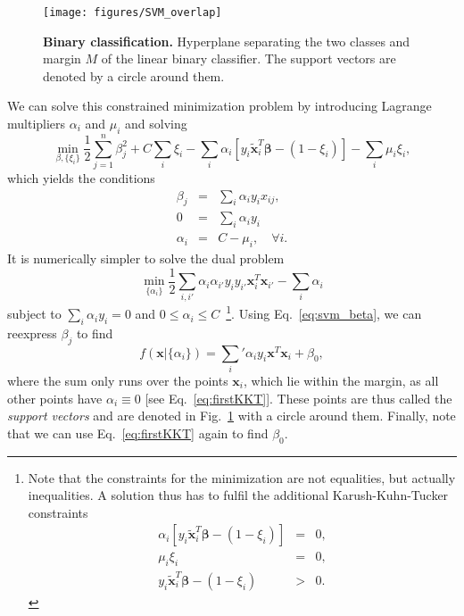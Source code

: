 \begin{figure}[bt]
  \centering
  \texttt{[image: figures/SVM\_overlap]}
  \caption{{\bf Binary classification.} Hyperplane separating the two classes and margin $M$ of the linear binary classifier. The support vectors are denoted by a circle around them.}
  \label{fig:svm}
\end{figure}
We can solve this constrained minimization problem by introducing Lagrange multipliers $\alpha_i$ and $\mu_i$ and solving 
\begin{equation}
  \min_{\beta, \{\xi_i\}} \frac12 \sum_{j=1}^{n} \beta_j^2 + C\sum_i \xi_i - \sum_i \alpha_i [y_i \tilde{\bm{x}}_i^T\bm{\beta} - (1-\xi_i)] - \sum_i\mu_i\xi_i,
  \label{eq:svm_lagrange}
\end{equation}
which yields the conditions
\begin{eqnarray}
  \beta_j &=& \sum_i \alpha_i y_i x_{ij},\label{eq:svm_beta}\\
  0 &=& \sum_i \alpha_i y_i\\
  \alpha_i &=& C-\mu_i, \quad \forall i.
\label{eq:svm_derivatives}
\end{eqnarray}
It is numerically simpler to solve the dual problem
\begin{equation}
  \min_{\{\alpha_i\}} \frac12 \sum_{i,i'} \alpha_i \alpha_{i'} y_i y_{i'} \bm{x}_i^T \bm{x}_{i'} - \sum_i \alpha_i
  \label{eq:svm_dual}
\end{equation}
subject to $\sum_i \alpha_i y_i =0$ and $0\leq \alpha_i \leq C$~\footnote{Note that the constraints for the minimization are not equalities, but actually inequalities. A solution thus has to fulfil the additional Karush-Kuhn-Tucker constraints
  \begin{eqnarray}
    \alpha_i [y_i \tilde{\bm{x}}_i^T\bm{\beta} - (1-\xi_i)]&=&0,\label{eq:firstKKT}\\
    \mu_i\xi_i &=& 0,\\
    y_i \tilde{\bm{x}}_i^T\bm{\beta} - (1-\xi_i)&>& 0.
  \end{eqnarray}
}.
Using Eq.~\eqref{eq:svm_beta}, we can reexpress $\beta_j$ to find
\begin{equation}
  f(\bm{x}|\{\alpha_i\}) = \sum_i{}' \alpha_i y_i \bm{x}^T \bm{x}_i + \beta_0,
  \label{eq:svm_f}
\end{equation}
where the sum only runs over the points $\bm{x}_i$, which lie within the margin, as all other points have $\alpha_i\equiv0$ [see Eq.~\eqref{eq:firstKKT}]. These points are thus called the \emph{support vectors} and are denoted in Fig.~\ref{fig:svm} with a circle around them. Finally, note that we can use Eq.~\eqref{eq:firstKKT} again to find $\beta_0$.
\vspace{11pt}

